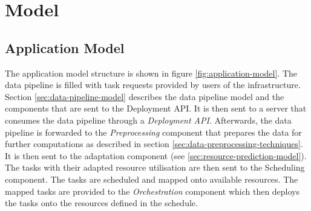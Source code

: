 \chapter{Model} %
\label{ch:model-methodology}


    \section{Application Model}
    \label{sec:application-model}






    The application model structure is shown in figure \ref{fig:application-model}.
    The data pipeline is filled with task requests provided by users of the infrastructure.
    Section \ref{sec:data-pipeline-model} describes the data pipeline model and the components that are sent to the Deployment API.
    It is then sent to a server that consumes the data pipeline through a \emph{Deployment API}.
    Afterwards, the data pipeline is forwarded to the \emph{Preprocessing} component that prepares the data for further computations as described in section \ref{sec:data-preprocessing-techniques}.
    It is then sent to the adaptation component (see \ref{sec:resource-prediction-model}). The tasks with their adapted resource utilisation are then sent to the Scheduling component. 
    The tasks are scheduled and mapped onto available resources. 
    The mapped tasks are provided to the \emph{Orchestration} component which then deploys the tasks onto the resources defined in the schedule.



